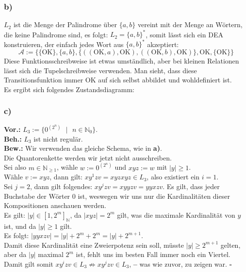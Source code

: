 \documentclass[12pt, a4paper]{article}
\newcommand*{\qed}{\null\nobreak\hfill\ensuremath{\square}}
\newcommand*{\gedanke}{\textbf{-- }}
\newcommand*{\gap}{\text{ }}
\newcommand*{\setDef}{\gap|\gap}
\newcommand*{\vor}{\textbf{Vor.:} \gap}
\newcommand*{\beh}{\textbf{Beh.:} \gap}
\newcommand*{\bew}{\textbf{Bew.:} \gap}
\begin{document}
\subsubsection*{b)}
\(L_2\) ist die Menge der Palindrome über \(\{a,b\}\) vereint mit der Menge an Wörtern, die keine Palindrome sind, es folgt: \(L_2 = \{a,b\}^*\), somit lässt sich ein DEA konstruieren, der einfach jedes Wort aus \(\{a,b\}^*\) akzeptiert:\vspace*{-0.5cm}
\[\mathcal A := \{\{\text{OK}\}, \{a,b\}, \{((\text{OK}, a), \text{OK}), ((\text{OK}, b), \text{OK})\}, \text{OK}, \{\text{OK}\}\}\]
Diese Funktionsschreibweise ist etwas umständlich, aber bei kleinen Relationen lässt sich die Tupelschreibweise verwenden. Man sieht, dass diese Transitionsfunktion immer OK auf sich selbst abbildet und wohldefiniert ist.\\
Es ergibt sich folgendes Zustandsdiagramm:

\vspace*{-1.8cm}
\hspace*{+10cm}
 \vspace*{-1cm}
\onehalfspacing
\subsubsection*{c)}
\vor \(L_3 := \{0^{(2^n)} \setDef n \in \mathbb N_0\}\). \\
\beh \(L_3\) ist nicht regulär. \\
\bew Wir verwenden das gleiche Schema, wie in \textbf{a)}.\\Die Quantorenkette werden wir jetzt nicht ausschreiben. \\
Sei also \(m\in \mathbb{N}_{\ge 1}\), wähle \(w := 0^{(2^n)}\) und \(xyz := w\) mit \(|y|\ge 1\). \\
Wähle \(v := xyz\), dann gilt: \(xy^1zv = xyzxyz \in L_3\), also existiert ein \(i = 1\). \\
Sei \(j = 2\), dann gilt folgendes: \(xy^jzv = xyyzv = yyxzv\). Es gilt, dass jeder Buchstabe der Wörter 0 ist, weswegen wir uns nur die Kardinalitäten dieser Kompositionen anschauen werden.\\
Es gilt: \(|y| \in [1, 2^m]_\mathbb N\), da \(|xyz| = 2^m\) gilt, was die maximale Kardinalität von \(y\) ist, und da \(|y| \ge 1\) gilt. \\
Es folgt: \(|yyxzv| = |y| + 2^m + 2^m = |y| + 2^{m+1}\). \\
Damit diese Kardinalität eine Zweierpotenz sein soll, müsste \(|y| \ge 2^{m+1}\) gelten, aber da \(|y|\) maximal \(2^m\) ist, fehlt uns im besten Fall immer noch ein Viertel.\\
Damit gilt somit \(xy^izv \in L_3 \not\Rightarrow xy^jzv \in L_3\), \gedanke was wie zuvor, zu zeigen war. \qed
\end{document}

